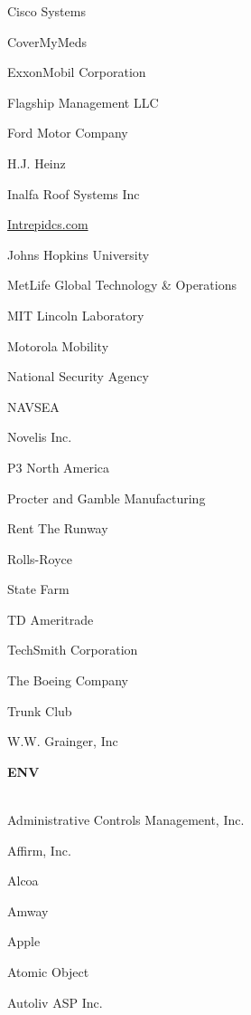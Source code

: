 \documentclass[twoside]{article}
\begin{document}
\begin{center}
\begin{multicols}{5}
\begin{FlushLeft}
\begin{compactitem}
\item Cisco Systems
\item CoverMyMeds
\item ExxonMobil Corporation
\item Flagship Management LLC
\item Ford Motor Company
\item H.J. Heinz
\item Inalfa Roof Systems Inc
\item \url{Intrepidcs.com}
\item Johns Hopkins University
\item MetLife Global Technology \& Operations
\item MIT Lincoln Laboratory
\item Motorola Mobility
\item National Security Agency
\item NAVSEA
\item Novelis Inc.
\item P3 North America
\item Procter and Gamble Manufacturing
\item Rent The Runway
\item Rolls-Royce
\item State Farm
\item TD Ameritrade
\item TechSmith Corporation
\item The Boeing Company
\item Trunk Club
\item W.W. Grainger, Inc
\end{compactitem}
        \end{FlushLeft}
        \vspace{1em}
        {\fontsize{14}{16}\selectfont \bf ENV}\\
        \vspace{-1em}
        ~\hrulefill~
        \vspace{-.9em}
        \begin{FlushLeft}
        \begin{compactitem}
        \item Administrative Controls Management, Inc.
\item Affirm, Inc.
\item Alcoa
\item Amway
\item Apple
\item Atomic Object
\item Autoliv ASP Inc.

\end{compactitem}
\end{FlushLeft}
\end{multicols}
\end{center}
\end{document}
